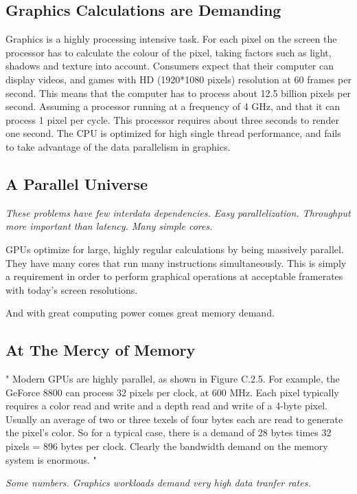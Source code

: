 \documentclass[../main/report.tex]{subfiles}
\begin{document}
\subsection{Graphics Calculations are Demanding}
Graphics is a highly processing intensive task. 
For each pixel on the screen the processor has to calculate the colour of the pixel, taking factors such as light, shadows and texture into account.
Consumers expect that their computer can display videos, and games with HD (1920*1080 pixels) resolution at 60 frames per second.
This means that the computer has to process about 12.5 billion pixels per second.
Assuming a processor running at a frequency of 4 GHz, and that it can process 1 pixel per cycle.
This processor requires about three seconds to render one second.
The CPU is optimized for high single thread performance, and fails to take advantage of the data parallelism in graphics.

\subsection{A Parallel Universe}

\textit{These problems have few interdata dependencies.
Easy parallelization. Throughput more important than latency. Many simple cores.}

GPUs optimize for large, highly regular calculations by being massively parallel.
They have many cores that run many instructions simultaneously.
This is simply a requirement in order to perform graphical operations at acceptable framerates with today's screen resolutions.


And with great computing power comes great memory demand.

\subsection{At The Mercy of Memory}
"
Modern GPUs are highly parallel, as shown in Figure C.2.5. For example, the GeForce 8800 can process 32 pixels per clock, at 600 MHz. Each pixel typically requires a color read and write and a depth read and write of a 4-byte pixel. Usually an average of two or three texels of four bytes each are read to generate the pixel’s color. So for a typical case, there is a demand of 28 bytes times 32 pixels = 896 bytes per clock. Clearly the bandwidth demand on the memory system is enormous.
"

\textit{Some numbers. Graphics workloads demand very high data tranfer rates.}
\end{document}
